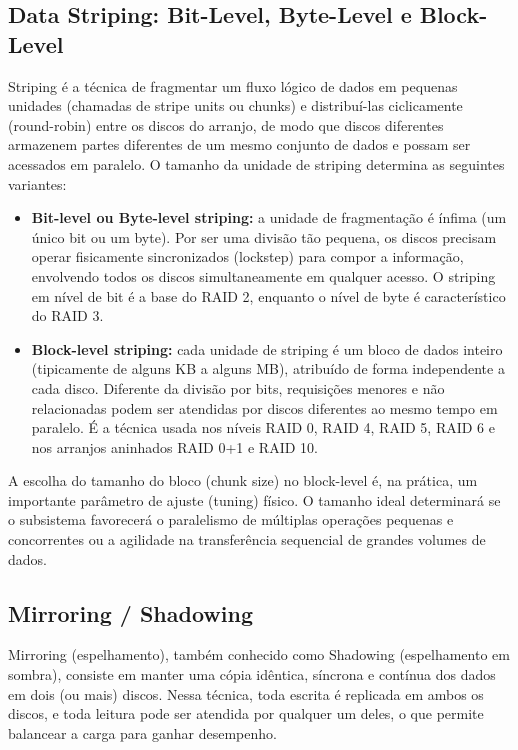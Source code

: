 \documentclass[11pt,a4paper]{article}
\begin{document}
\subsection{Data Striping: Bit-Level, Byte-Level e Block-Level}
Striping é a técnica de fragmentar um fluxo lógico de dados em pequenas unidades (chamadas de stripe units ou chunks) e distribuí-las ciclicamente (round-robin) entre os discos do arranjo, de modo que discos diferentes armazenem partes diferentes de um mesmo conjunto de dados e possam ser acessados em paralelo. O tamanho da unidade de striping determina as seguintes variantes:

\begin{itemize}[leftmargin=*]
    \item \textbf{Bit-level ou Byte-level striping:} a unidade de fragmentação é ínfima (um único bit ou um byte). Por ser uma divisão tão pequena, os discos precisam operar fisicamente sincronizados (lockstep) para compor a informação, envolvendo todos os discos simultaneamente em qualquer acesso. O striping em nível de bit é a base do RAID 2, enquanto o nível de byte é característico do RAID 3.
    \item \textbf{Block-level striping:} cada unidade de striping é um bloco de dados inteiro (tipicamente de alguns KB a alguns MB), atribuído de forma independente a cada disco. Diferente da divisão por bits, requisições menores e não relacionadas podem ser atendidas por discos diferentes ao mesmo tempo em paralelo. É a técnica usada nos níveis RAID 0, RAID 4, RAID 5, RAID 6 e nos arranjos aninhados RAID 0+1 e RAID 10.
\end{itemize}

A escolha do tamanho do bloco (chunk size) no block-level é, na prática, um importante parâmetro de ajuste (tuning) físico. O tamanho ideal determinará se o subsistema favorecerá o paralelismo de múltiplas operações pequenas e concorrentes ou a agilidade na transferência sequencial de grandes volumes de dados.

\subsection{Mirroring / Shadowing}
Mirroring (espelhamento), também conhecido como Shadowing (espelhamento em sombra), consiste em manter uma cópia idêntica, síncrona e contínua dos dados em dois (ou mais) discos. Nessa técnica, toda escrita é replicada em ambos os discos, e toda leitura pode ser atendida por qualquer um deles, o que permite balancear a carga para ganhar desempenho.
\end{document}
